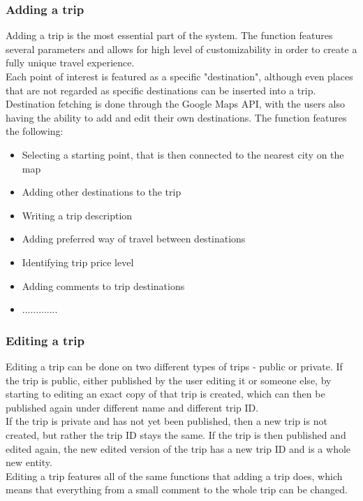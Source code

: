 \subsubsection{Adding a trip}
\hspace{\parindent}Adding a trip is the most essential part of the system. The function features several parameters and allows for high level of customizability in order to create a fully unique travel experience. \\
Each point of interest is featured as a specific "destination", although even places that are not regarded as specific destinations can be inserted into a trip. Destination fetching is done through the Google Maps API, with the users also having the ability to add and edit their own destinations.
The function features the following:
\begin{itemize}
\item Selecting a starting point, that is then connected to the nearest city on the map
\item Adding other destinations to the trip
\item Writing a trip description
\item Adding preferred way of travel between destinations
\item Identifying trip price level
\item Adding comments to trip destinations
\item .............
\end{itemize}
\subsubsection{Editing a trip}
\hspace{\parindent}Editing a trip can be done on two different types of trips - public or private. If the trip is public, either published by the user editing it or someone else, by starting to editing an exact copy of that trip is created, which can then be published again under different name and different trip ID.\\
If the trip is private and has not yet been published, then a new trip is not created, but rather the trip ID stays the same. If the trip is then published and edited again, the new edited version of the trip has a new trip ID and is a whole new entity.\\
Editing a trip features all of the same functions that adding a trip does, which means that everything from a small comment to the whole trip can be changed. 
